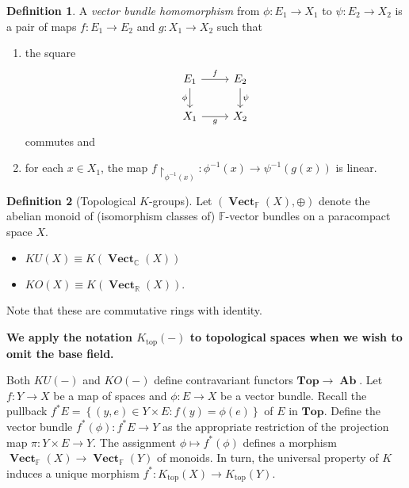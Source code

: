 \documentclass[10pt,letterpaper,cm]{nupset}
\theoremstyle{definition}
\newtheorem{definition}{Definition}[section]
\theoremstyle{theorem}
\theoremstyle{remark}
\newcommand{\C}{\mathbb C}
\newcommand{\F}{\mathbb F}
\newcommand{\R}{\mathbb R}
\newcommand{\1}{\mathbf{1}}
\newcommand{\0}{\vec 0}
\DeclareMathOperator{\vect}{\mathbf{Vect}}
\DeclareMathOperator{\topp}{\mathrm{top}}
\DeclareMathOperator{\Ab}{\mathbf{Ab}}
\begin{document}
\begin{definition}
A \textit{vector bundle homomorphism} from $\phi : E_1 \to X_1$ to $\psi : E_2 \to X_2$ is a pair of maps $f: E_1 \to E_2$ and $g: X_1 \to X_2$ such that
\begin{enumerate}[label=(\roman*)]
\item the square
\[
\begin{tikzcd}
E_1 \arrow[r, "f"] \arrow[d, "\phi"'] & E_2 \arrow[d, "\psi"] \\
X_1 \arrow[r, "g"'] & X_2
\end{tikzcd}
\] commutes and
\item for each $x \in X_1$, the map $f \restriction_{\phi^{{-1}}(x)} : \phi^{{-1}}(x) \to \psi^{{-1}}(g(x))$ is linear.
\end{enumerate}
\end{definition}

\begin{definition}[Topological $K$-groups]
Let $\left(\vect_{\F}(X), \oplus\right)$ denote the abelian monoid of (isomorphism classes of) $\F$-vector bundles on a paracompact space $X$. 
\begin{itemize}
\item $KU(X) \equiv K(\vect_{\C}(X))$ 
\item $KO(X) \equiv K(\vect_{\R}(X)).$
\end{itemize}
\end{definition}

Note that these are commutative rings with identity. 

\smallskip

\begin{center}
 \textbf{We apply the notation $K_{\topp}(-)$ to topological spaces when we wish to omit the base field.}
\end{center}

\medskip

Both $KU(-)$ and $KO(-)$ define contravariant functors $\mathbf{Top} \to \Ab$. Let $f: Y \to X$ be a map of spaces and $\phi : E \to X$ be a vector bundle. Recall the pullback $f^{\ast}E = \left\{\left(y, e\right) \in Y \times E : f(y) = \phi(e)\right\}$ of $E$ in $\mathbf{Top}$.  Define the vector bundle $f^{\ast}(\phi) : f^{\ast}E \to Y$ as the appropriate restriction of the projection map $\pi : Y \times E \to Y$. The assignment $\phi \mapsto f^{\ast}(\phi)$ defines a morphism  $\vect_{\F}(X) \to \vect_{\F}(Y)$ of monoids. In turn, the universal property of $K$ induces a unique morphism $f^{\ast}: K_{\topp}(X) \to K_{\topp}(Y)$.
\end{document}

